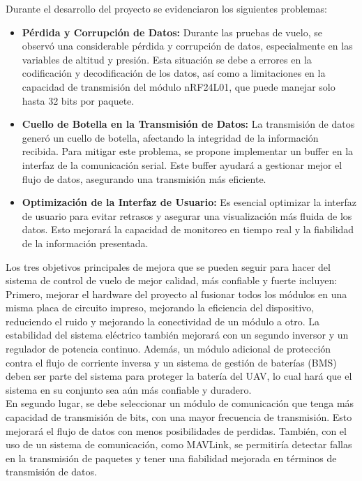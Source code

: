 Durante el desarrollo del proyecto se evidenciaron los siguientes problemas:
\begin{itemize}
    \item \textbf{Pérdida y Corrupción de Datos:} Durante las pruebas de vuelo, se observó una considerable pérdida y corrupción de datos, especialmente en las variables de altitud y presión. Esta situación se debe a errores en la codificación y decodificación de los datos, así como a limitaciones en la capacidad de transmisión del módulo nRF24L01, que puede manejar solo hasta 32 bits por paquete.
    
    \item \textbf{Cuello de Botella en la Transmisión de Datos:} La transmisión de datos generó un cuello de botella, afectando la integridad de la información recibida. Para mitigar este problema, se propone implementar un buffer en la interfaz de la comunicación serial. Este buffer ayudará a gestionar mejor el flujo de datos, asegurando una transmisión más eficiente.
    
    \item \textbf{Optimización de la Interfaz de Usuario:} Es esencial optimizar la interfaz de usuario para evitar retrasos y asegurar una visualización más fluida de los datos. Esto mejorará la capacidad de monitoreo en tiempo real y la fiabilidad de la información presentada.

\end{itemize}


Los tres objetivos principales de mejora que se pueden seguir para hacer del sistema de control de vuelo de mejor calidad, más confiable y fuerte incluyen:\\

Primero, mejorar el hardware del proyecto al fusionar todos los módulos en una misma placa de circuito impreso, mejorando la eficiencia del dispositivo, reduciendo el ruido y mejorando la conectividad de un módulo a otro. La estabilidad del sistema eléctrico también mejorará con un segundo inversor y un regulador de potencia continuo. Además, un módulo adicional de protección contra el flujo de corriente inversa y un sistema de gestión de baterías (BMS) deben ser parte del sistema para proteger la batería del UAV, lo cual hará que el sistema en su conjunto sea aún más confiable y duradero.\\

En segundo lugar, se debe seleccionar un módulo de comunicación que tenga más capacidad de transmisión de bits, con  una mayor frecuencia de transmisión. Esto mejorará el flujo de datos con menos posibilidades de perdidas. También, con el uso de un sistema de comunicación, como MAVLink, se permitiría detectar fallas en la transmisión de paquetes y tener una fiabilidad mejorada en términos de transmisión de datos.\\

